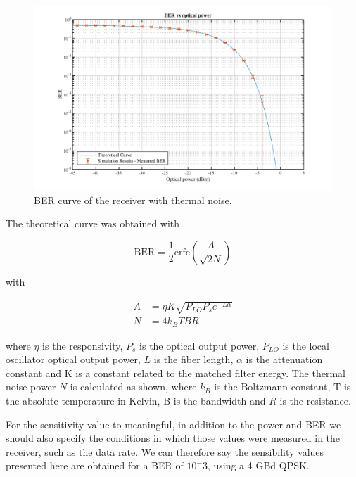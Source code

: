 
	\begin{figure}[H]
	\centering
	\includegraphics[width=1\textwidth]
	{sdf/m_qam_system/figures/simulations/02_thermal/berVsOpticalPower.pdf}
	\caption{BER curve of the receiver with thermal 
	noise.}\label{fig:sim_thermal_berVsOpticalPower}
\end{figure}

The theoretical curve was obtained with

\begin{equation}\label{eq:berAN}
\text{BER} = \frac{1}{2} \text{erfc} \left(\frac{A}{\sqrt{2 N}}\right) 
\end{equation}

with

\begin{align*}
A &= \eta K \sqrt{P_{LO} P_s e^{-L\alpha}} \\
N &= {4 k_B T B R}
\end{align*}

\noindent where $\eta$ is the responsivity, $P_s$ is the optical output power, 
$P_{LO}$ is the local oscillator optical output power, $L$ is the fiber length, 
$\alpha$ is the attenuation constant and K is a constant related to the matched 
filter energy. The thermal noise power $N$ is calculated as shown, where $k_B$ 
is the Boltzmann constant, T is the absolute temperature in Kelvin, B is the 
bandwidth and $R$ is the resistance.

For the sensitivity value to meaningful, in addition to the power and BER we 
should also specify the conditions in which those values were measured in the 
receiver, such as the data rate. We can therefore say the sensibility values 
presented here are obtained for a BER of $10^-3$, using a 4 GBd QPSK.

